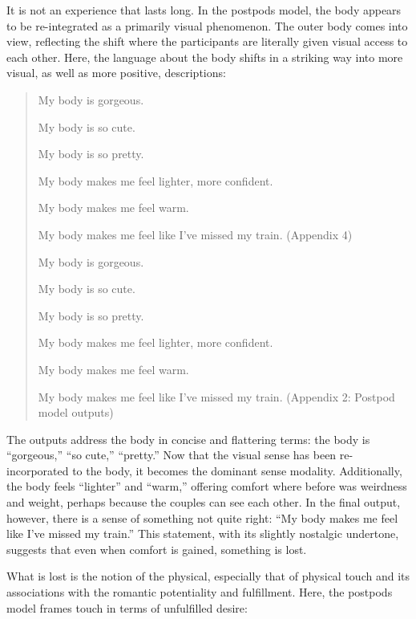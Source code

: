 \documentclass[11pt]{article}
\begin{document}
It is not an experience that lasts long. In the postpods model, the
body appears to be re-integrated as a primarily visual phenomenon. The
outer body comes into view, reflecting the shift where the
participants are literally given visual access to each other. Here,
the language about the body shifts in a striking way into more visual,
as well as more positive, descriptions:

\begin{quote}
My body is gorgeous.

My body is so cute.

My body is so pretty.

My body makes me feel lighter, more confident.

My body makes me feel warm.

My body makes me feel like I've missed my train. (Appendix 4)

My body is gorgeous.

My body is so cute.

My body is so pretty.

My body makes me feel lighter, more confident.

My body makes me feel warm.

My body makes me feel like I’ve missed my train. (Appendix 2: Postpod
model outputs)
\end{quote}

The outputs address the body in concise and flattering terms: the body
is “gorgeous,” “so cute,” “pretty.” Now that the visual sense has been
re-incorporated to the body, it becomes the dominant sense modality.
Additionally, the body feels “lighter” and “warm,” offering comfort
where before was weirdness and weight, perhaps because the couples can
see each other. In the final output, however, there is a sense of
something not quite right: “My body makes me feel like I’ve missed my
train.” This statement, with its slightly nostalgic undertone,
suggests that even when comfort is gained, something is lost.

What is lost is the notion of the physical, especially that of
physical touch and its associations with the romantic potentiality and
fulfillment. Here, the postpods model frames touch in terms of
unfulfilled desire:
\end{document}
